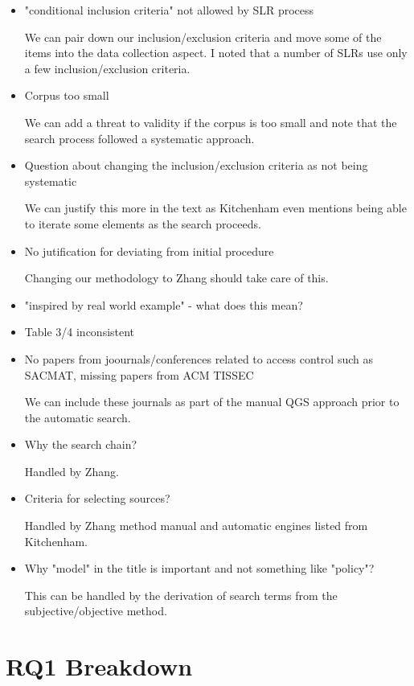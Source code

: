 \begin{itemize}
\item "conditional inclusion criteria" not allowed by SLR process

We can pair down our inclusion/exclusion criteria and move some of the items into the data collection aspect.
I noted that a number of SLRs use only a few inclusion/exclusion criteria.

\item Corpus too small

We can add a threat to validity if the corpus is too small and note that the search process followed a systematic approach.

\item Question about changing the inclusion/exclusion criteria as not being systematic

We can justify this more in the text as Kitchenham even mentions being able to iterate some elements as the search proceeds.

\item No jutification for deviating from initial procedure

Changing our methodology to Zhang should take care of this.

\item "inspired by real world example" - what does this mean?

\item Table 3/4 inconsistent

\item No papers from joournals/conferences related to access control such as SACMAT, missing papers from ACM TISSEC

We can include these journals as part of the manual QGS approach prior to the automatic search.

\item Why the search chain?

Handled by Zhang.

\item Criteria for selecting sources?

Handled by Zhang method manual and automatic engines listed from Kitchenham.

\item Why "model" in the title is important and not something like "policy"?

This can be handled by the derivation of search terms from the subjective/objective method.

\end{itemize}


\section{RQ1 Breakdown}

